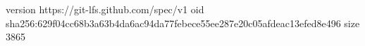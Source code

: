 version https://git-lfs.github.com/spec/v1
oid sha256:629f04cc68b3a63b4da6ac94da77febece55ee287e20c05afdeac13efed8e496
size 3865
